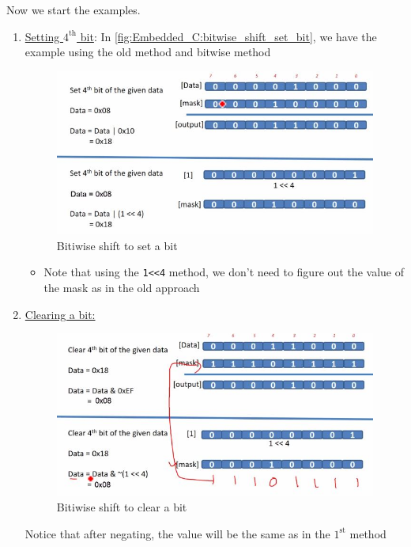 Now we start the examples.

\begin{enumerate}
    \item \underline{Setting $4^\mathrm{th}$ bit}: In \autoref{fig:Embedded_C:bitwise_shift_set_bit}, we have the example using the old method and bitwise method
    

\begin{figure}[h]
\centering
\includegraphics[scale=0.7]{Figures/Embedded_C/bitwise_shift_set_bit}
\caption{Bitiwise shift to set a bit}
\label{fig:Embedded_C:bitwise_shift_set_bit}
\end{figure}

	\begin{itemize}
	\item Note that using the \verb|1<<4| method, we don't need to figure out the value of the mask as in the old approach
	\end{itemize}
    
    
    
    \item \underline{Clearing a bit:}
    
    
    \begin{figure}[h]
\centering
\includegraphics[scale=0.7]{Figures/Embedded_C/bitwise_shift_clear_bit}
\caption{Bitiwise shift to clear a bit}
\label{fig:Embedded_C:bitwise_shift_clear_bit}
\end{figure}
    
    
    Notice that after negating, the value will be the same as in the $\mathrm{1}^\mathrm{st}$ method
    
\end{enumerate}

